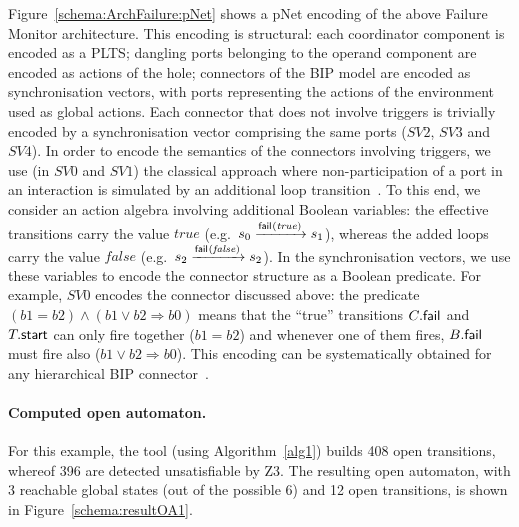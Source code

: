 \documentclass[smallcondensed]{svjour3}
\newcommand{\noteSB}[2][color=green!40, size=\tiny]{\todo[#1]{{\bf Simon: } {#2}}}
\newcommand{\noteEM}[2][color=blue!40, size=\tiny]{\todo[#1]{{\bf Eric: } {#2}}}
\newcommand{\eg}[1][\ ]{e.g.#1}
\newcommand{\goesto}[2][]{\ensuremath{\xrightarrow[#1]{#2}}}
\newcommand{\true}{\ensuremath{\mathit{true}}}
\newcommand{\false}{\ensuremath{\mathit{false}}}
\begin{document}
Figure~\ref{schema:ArchFailure:pNet} shows a pNet encoding of the
above Failure Monitor architecture.  This encoding is structural: each
coordinator component is encoded as a PLTS; dangling ports belonging
to the operand component are encoded as actions of the hole; 
connectors of the BIP model are encoded as synchronisation vectors,
with ports
  representing the actions of the environment used as global actions.
Each connector that does not involve triggers is trivially encoded by
a synchronisation vector comprising the same ports ($SV2$, $SV3$ and
$SV4$).  In order to encode the semantics of the connectors involving
triggers, we use (in $SV0$ and $SV1$) the classical approach where
non-participation of a port in an interaction is simulated by an
additional loop transition~\cite{milner83-calculi}.  To this end, we
consider an action algebra involving additional Boolean variables: the
effective transitions carry the value $\true$ (\eg $\cstate{0}
\goesto{\PortFail(\true)} \cstate{1}$), whereas the added loops carry
the value $\false$ (\eg $\cstate{2} \goesto{\PortFail(\false)}
\cstate{2}$).  In the synchronisation vectors, we use these variables
to encode the connector structure as a Boolean predicate.  For
example, $SV0$ encodes the connector discussed above: the predicate
$(b1=b2) \land (b1\lor b2 \Rightarrow b0)$ means that the ``true''
transitions $C_{}.\mathsf{fail}_{}$ and $T_{}.\mathsf{start}$ can only
fire together ($b1 = b2$) and whenever one of them fires,
$B.\mathsf{fail}_{}$ must fire also ($b1 \lor b2 \Rightarrow b0$).
This encoding can be systematically obtained for any hierarchical BIP
connector~\cite{BliSif10-causal-fmsd}.
%



\paragraph{Computed open automaton.}

For this example, the tool (using Algorithm~\ref{alg1}) builds 408 open transitions, whereof 396
are detected unsatisfiable by Z3.  The resulting open automaton, with
3 reachable global states (out of the possible 6) and 12 open
transitions, is shown in Figure~\ref{schema:resultOA1}.
\end{document}
